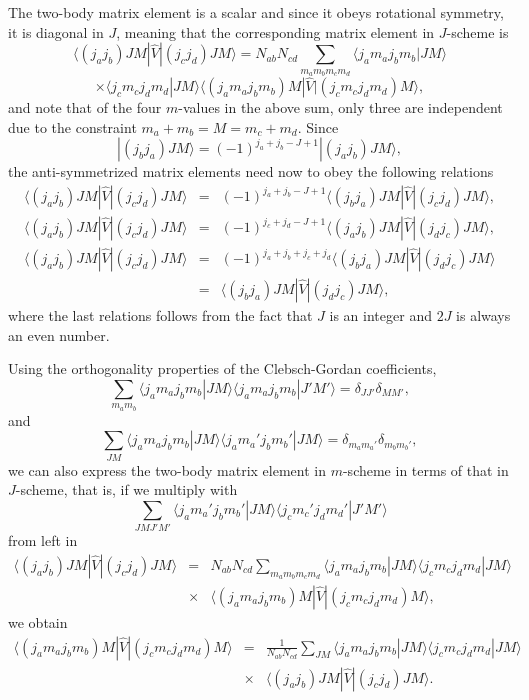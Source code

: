 \documentclass[graybox,sectrefs,envcountresetchap,open=right]{svmonodo}
\begin{document}
The two-body matrix element is a scalar and since it obeys rotational symmetry, it is diagonal in $J$, 
meaning that the corresponding matrix element in $J$-scheme is 
\[
\langle (j_aj_b) JM | \hat{V} | (j_cj_d) JM \rangle = N_{ab}N_{cd}\sum_{m_am_b m_cm_d}\langle j_am_aj_bm_b|JM\rangle
\]
\[\times \langle j_cm_cj_dm_d|JM\rangle\langle (j_am_aj_bm_b)M |  \hat{V} | (j_cm_cj_dm_d)M \rangle,
\]
and note that of the four $m$-values in the above sum, only three are independent due to the constraint $m_a+m_b=M=m_c+m_d$.
Since
\[
|(j_bj_a)JM\rangle=(-1)^{j_a+j_b-J+1}|(j_aj_b)JM\rangle,
\]
the anti-symmetrized matrix elements need now to obey the following relations
\begin{eqnarray*}
\langle (j_aj_b) JM | \hat{V} | (j_cj_d) JM \rangle & = & (-1)^{j_a+j_b-J+1}\langle (j_bj_a) JM | \hat{V} | (j_cj_d) JM \rangle, \\
\langle (j_aj_b) JM | \hat{V} | (j_cj_d) JM \rangle & = & (-1)^{j_c+j_d-J+1}\langle (j_aj_b) JM | \hat{V} | (j_dj_c) JM \rangle,\\
\langle (j_aj_b) JM | \hat{V} | (j_cj_d) JM \rangle & = & (-1)^{j_a+j_b+j_c+j_d}\langle (j_bj_a) JM | \hat{V} | (j_dj_c) JM \rangle \\ & = & \langle (j_bj_a) JM | \hat{V} | (j_dj_c) JM \rangle,
\end{eqnarray*}
where the last relations follows from the fact that $J$ is an integer and $2J$ is always an even number.

Using the orthogonality properties of the Clebsch-Gordan coefficients,
\[
\sum_{m_am_b}\langle j_am_aj_bm_b|JM\rangle\langle j_am_aj_bm_b|J'M'\rangle=\delta_{JJ'}\delta_{MM'},
\]
and
\[
\sum_{JM}\langle j_am_aj_bm_b|JM\rangle\langle j_am_a'j_bm_b'|JM\rangle=\delta_{m_am_a'}\delta_{m_bm_b'},
\]
we can also express the two-body matrix element in $m$-scheme in terms of that in $J$-scheme, that is, if we multiply with 
\[
\sum_{JMJ'M'}\langle j_am_a'j_bm_b'|JM\rangle\langle j_cm_c'j_dm_d'|J'M'\rangle
\]
from left in
\begin{eqnarray*}
\langle (j_a j_b) JM | \hat{V} | (j_c j_d) JM \rangle & = & N_{ab}N_{cd}\sum_{m_a m_b m_c m_d}\langle j_am_aj_bm_b|JM\rangle\langle j_cm_cj_dm_d|JM\rangle \\
& \times & \langle (j_am_aj_bm_b)M|  \hat{V} | (j_cm_cj_dm_d)M\rangle,
\end{eqnarray*}
we obtain
\begin{eqnarray*}
\langle (j_am_aj_bm_b)M |  \hat{V} | (j_cm_cj_dm_d)M\rangle & = & \frac{1}{N_{ab}N_{cd}}\sum_{JM}\langle j_am_aj_bm_b|JM\rangle\langle j_cm_cj_dm_d|JM\rangle \\
& \times & \langle (j_aj_b) JM | \hat{V} | (j_cj_d) JM \rangle.
\end{eqnarray*}
\end{document}
